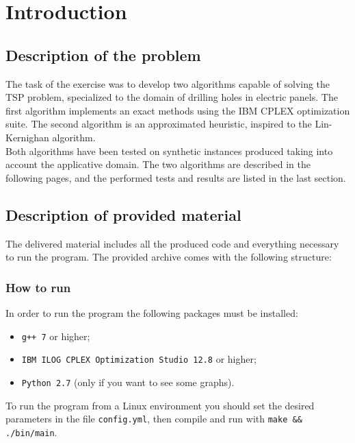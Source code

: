 
\section{Introduction}
\label{chap:introduction}

\subsection{Description of the problem}
The task of the exercise was to develop two algorithms capable of solving the TSP problem, specialized to the domain of drilling holes in electric panels. The first algorithm implements an exact methods using the IBM CPLEX optimization suite. The second algorithm is an approximated heuristic, inspired to the Lin-Kernighan algorithm\cite{LinK73}.\\ Both algorithms have been tested on synthetic instances produced taking into account the applicative domain. The two algorithms are described in the following pages, and the performed tests and results are listed in the last section.

\subsection{Description of provided material}
The delivered material includes all the produced code and everything necessary to run the program.
The provided archive comes with the following structure:
\renewcommand*\DTstylecomment{\rmfamily\color{blue}\textit}

\subsubsection{How to run}
In order to run the program the following packages must be installed:
\begin{itemize}
	\item \texttt{g++ 7} or higher;
	\item \texttt{IBM ILOG CPLEX Optimization Studio 12.8} or higher;
	\item \texttt{Python 2.7} (only if you want to see some graphs).
\end{itemize}

To run the program from a Linux environment you should set the desired parameters in the file \texttt{config.yml}, then compile and run with \texttt{make \&\& ./bin/main}.
